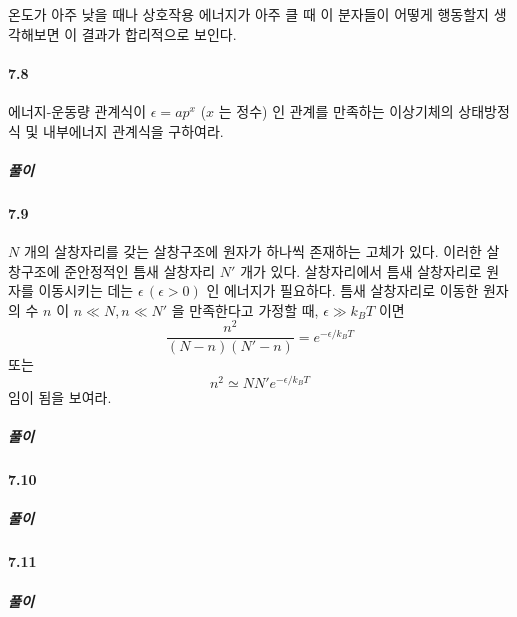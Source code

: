 \documentclass[a4paper,12pt]{report}
\begin{document}
	온도가 아주 낮을 때나 상호작용 에너지가 아주 클 때 이 분자들이 어떻게 행동할지 생각해보면 이 결과가 합리적으로 보인다. 
	\paragraph{7.8 } 에너지-운동량 관계식이 $\epsilon=ap^x$ ($x$ 는 정수) 인 관계를 만족하는 이상기체의 상태방정식 및 내부에너지 관계식을 구하여라. 
	\subparagraph{풀이}
	\paragraph{7.9 }$N$ 개의 살창자리를 갖는 살창구조에 원자가 하나씩 존재하는 고체가 있다. 이러한 살창구조에 준안정적인 틈새 살창자리 $N'$ 개가 있다. 살창자리에서 틈새 살창자리로 원자를 이동시키는 데는 $\epsilon\,(\epsilon>0)$ 인 에너지가 필요하다. 틈새 살창자리로 이동한 원자의 수 $n$ 이 $n\ll N, n\ll N'$ 을 만족한다고 가정할 때, $\epsilon\gg k_BT$ 이면 
	$$\frac{n^2}{(N-n)(N'-n)}=e^{-\epsilon/k_BT}$$ 또는
	$$n^2\simeq NN'e^{-\epsilon/k_BT}$$
	임이 됨을 보여라. 
	\subparagraph{풀이}
	\paragraph{7.10 }
	\subparagraph{풀이}
	\paragraph{7.11 }
	\subparagraph{풀이}
\end{document}
